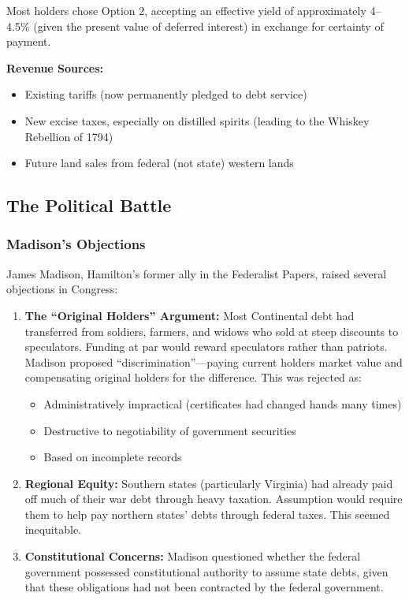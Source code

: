 \documentclass[12pt]{article}
\begin{document}
Most holders chose Option 2, accepting an effective yield of approximately 4--4.5\% (given the present value of deferred interest) in exchange for certainty of payment.

\textbf{Revenue Sources:}
\begin{itemize}
\item Existing tariffs (now permanently pledged to debt service)
\item New excise taxes, especially on distilled spirits (leading to the Whiskey Rebellion of 1794)
\item Future land sales from federal (not state) western lands
\end{itemize}

\subsection{The Political Battle}

\subsubsection{Madison's Objections}

James Madison, Hamilton's former ally in the Federalist Papers, raised several objections in Congress:

\begin{enumerate}
\item \textbf{The ``Original Holders'' Argument:} Most Continental debt had transferred from soldiers, farmers, and widows who sold at steep discounts to speculators. Funding at par would reward speculators rather than patriots. Madison proposed ``discrimination''---paying current holders market value and compensating original holders for the difference. This was rejected as:
\begin{itemize}
\item Administratively impractical (certificates had changed hands many times)
\item Destructive to negotiability of government securities
\item Based on incomplete records
\end{itemize}

\item \textbf{Regional Equity:} Southern states (particularly Virginia) had already paid off much of their war debt through heavy taxation. Assumption would require them to help pay northern states' debts through federal taxes. This seemed inequitable.

\item \textbf{Constitutional Concerns:} Madison questioned whether the federal government possessed constitutional authority to assume state debts, given that these obligations had not been contracted by the federal government.
\end{enumerate}
\end{document}
